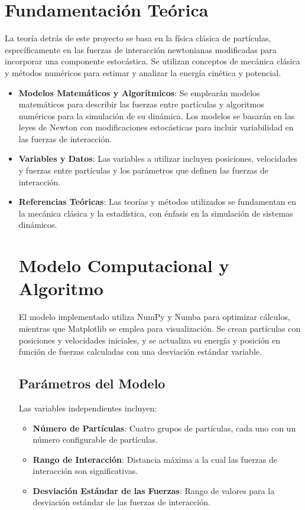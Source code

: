 \section{Fundamentación Teórica}
La teoría detrás de este proyecto se basa en la física clásica de partículas, específicamente en las fuerzas de interacción newtonianas modificadas para incorporar una componente estocástica. Se utilizan conceptos de mecánica clásica y métodos numéricos para estimar y analizar la energía cinética y potencial.

\begin{itemize}
\item \textbf{Modelos Matemáticos y Algorítmicos}: Se emplearán modelos matemáticos para describir las fuerzas entre partículas y algoritmos numéricos para la simulación de su dinámica. Los modelos se basarán en las leyes de Newton con modificaciones estocásticas para incluir variabilidad en las fuerzas de interacción.
\item \textbf{Variables y Datos}: Las variables a utilizar incluyen posiciones, velocidades y fuerzas entre partículas y los parámetros que definen las fuerzas de interacción.
\item \textbf{Referencias Teóricas}: Las teorías y métodos utilizados se fundamentan en la mecánica clásica y la estadística, con énfasis en la simulación de sistemas dinámicos.

\section{Modelo Computacional y Algoritmo}

El modelo implementado utiliza NumPy y Numba para optimizar cálculos, mientras que Matplotlib se emplea para visualización. Se crean partículas con posiciones y velocidades iniciales, y se actualiza su energía y posición en función de fuerzas calculadas con una desviación estándar variable.

\subsection{Parámetros del Modelo}
Las variables independientes incluyen:
\begin{itemize}
\item \textbf{Número de Partículas}: Cuatro grupos de partículas, cada uno con un número configurable de partículas.
\item \textbf{Rango de Interacción}: Distancia máxima a la cual las fuerzas de interacción son significativas.
\item \textbf{Desviación Estándar de las Fuerzas}: Rango de valores para la desviación estándar de las fuerzas de interacción.
\end{itemize}


\end{itemize}
